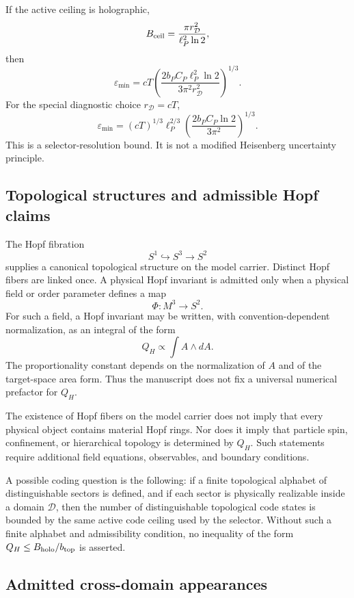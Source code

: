\documentclass[11pt,a4paper]{article}
\begin{document}
If the active ceiling is holographic,
\[
B_{\rm ceil}
=
\frac{\pi r_{\mathcal D}^2}{\ell_P^2\ln2},
\]
then
\[
\varepsilon_{\min}
=
cT
\left(
\frac{2b_PC_P\ell_P^2\ln2}
{3\pi^2r_{\mathcal D}^2}
\right)^{1/3}.
\]
For the special diagnostic choice \(r_{\mathcal D}=cT\),
\[
\varepsilon_{\min}
=
(cT)^{1/3}\ell_P^{2/3}
\left(
\frac{2b_PC_P\ln2}{3\pi^2}
\right)^{1/3}.
\]
This is a selector-resolution bound.  It is not a modified Heisenberg uncertainty principle.

\subsection{Topological structures and admissible Hopf claims}

The Hopf fibration
\[
S^1\hookrightarrow S^3\to S^2
\]
supplies a canonical topological structure on the model carrier.  Distinct Hopf fibers are linked once.  A physical Hopf invariant is admitted only when a physical field or order parameter defines a map
\[
\Phi:M^3\to S^2.
\]
For such a field, a Hopf invariant may be written, with convention-dependent normalization, as an integral of the form
\[
Q_H \propto \int A\wedge dA.
\]
The proportionality constant depends on the normalization of \(A\) and of the target-space area form.  Thus the manuscript does not fix a universal numerical prefactor for \(Q_H\).

The existence of Hopf fibers on the model carrier does not imply that every physical object contains material Hopf rings.  Nor does it imply that particle spin, confinement, or hierarchical topology is determined by \(Q_H\).  Such statements require additional field equations, observables, and boundary conditions.

A possible coding question is the following: if a finite topological alphabet of distinguishable sectors is defined, and if each sector is physically realizable inside a domain \(\mathcal D\), then the number of distinguishable topological code states is bounded by the same active code ceiling used by the selector.  Without such a finite alphabet and admissibility condition, no inequality of the form \(Q_H\le B_{\rm holo}/b_{\rm top}\) is asserted.

\subsection{Admitted cross-domain appearances}
\end{document}
